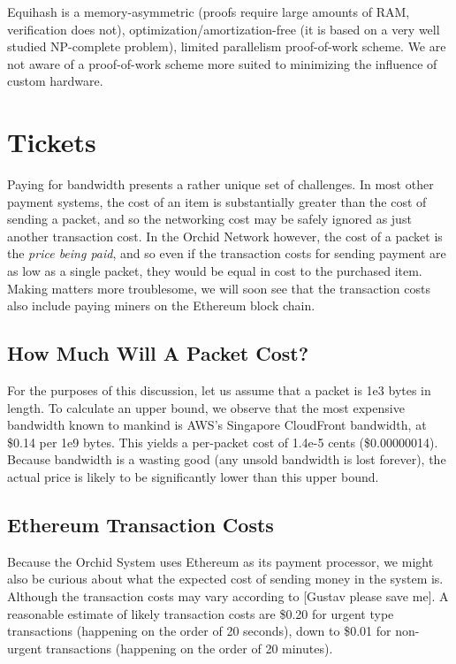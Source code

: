 \documentclass{article}
\newcommand{\mesh}{Orchid}
\begin{document}
Equihash is a memory-asymmetric (proofs require large amounts of RAM,
verification does not), optimization/amortization-free (it is based on
a very well studied NP-complete problem), limited parallelism
proof-of-work scheme. We are not aware of a proof-of-work scheme more
suited to minimizing the influence of custom hardware.

\section{Tickets}
\label{sec:tickets}

Paying for bandwidth presents a rather unique set of challenges. In most other payment systems, the cost of an item is substantially greater than the cost of sending a packet, and so the networking cost may be safely ignored as just another transaction cost. In the \mesh{} Network however, the cost of a packet is the \emph{price being paid}, and so even if the transaction costs for sending payment are as low as a single packet, they would be equal in cost to the purchased item. Making matters more troublesome, we will soon see that the transaction costs also include paying miners on the Ethereum block chain.

\subsection{How Much Will A Packet Cost?}

For the purposes of this discussion, let us assume that a packet is 1e3 bytes in length. To calculate an upper bound, we observe that the most expensive bandwidth known to mankind is AWS's Singapore CloudFront bandwidth, at \$0.14 per 1e9 bytes. This yields a per-packet cost of 1.4e-5 cents (\$0.00000014). Because bandwidth is a wasting good (any unsold bandwidth is lost forever), the actual price is likely to be significantly lower than this upper bound.

\subsection{Ethereum Transaction Costs}

Because the \mesh{} System uses Ethereum as its payment processor, we might also be curious about what the expected cost of sending money in the system is. Although the transaction costs may vary according to [Gustav please save me]. A reasonable estimate of likely transaction costs are \$0.20 for urgent type transactions (happening on the order of 20 seconds), down to \$0.01 for non-urgent transactions (happening on the order of 20 minutes).
\end{document}
